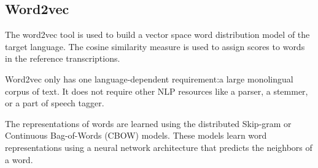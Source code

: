 
\subsection{Word2vec}
\label{sec:word2vec}


The word2vec tool is used to build a vector space word distribution model of the target language. 
The cosine similarity measure is used to assign scores to words in the reference transcriptions. 

Word2vec only has one language-dependent requirement:a large monolingual corpus of text. 
It does not require other NLP resources like a parser, a stemmer, or a part of speech tagger. 

The representations of words are learned using the distributed Skip-gram or Continuous Bag-of-Words (CBOW) models\cite{mikalov2013a}. 
These models learn word representations using a neural network architecture that predicts the neighbors of a word.


